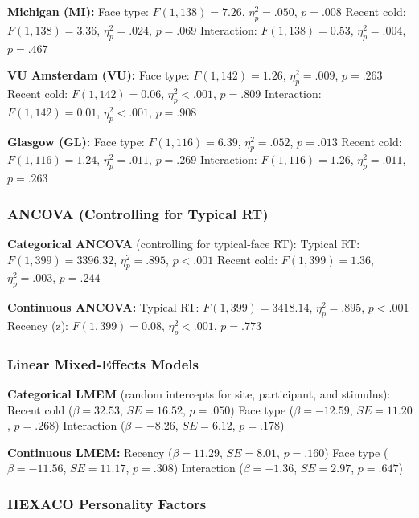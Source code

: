 \documentclass[
  english,
  man]{apa6}
\begin{document}
\textbf{Michigan (MI):}
Face type: \(F(1, 138) = 7.26\), \(\eta_{p}^{2} = .050\), \(p = .008\)
Recent cold: \(F(1, 138) = 3.36\), \(\eta_{p}^{2} = .024\), \(p = .069\)
Interaction: \(F(1, 138) = 0.53\), \(\eta_{p}^{2} = .004\), \(p = .467\)

\textbf{VU Amsterdam (VU):}
Face type: \(F(1, 142) = 1.26\), \(\eta_{p}^{2} = .009\), \(p = .263\)
Recent cold: \(F(1, 142) = 0.06\), \(\eta_{p}^{2} < .001\), \(p = .809\)
Interaction: \(F(1, 142) = 0.01\), \(\eta_{p}^{2} < .001\), \(p = .908\)

\textbf{Glasgow (GL):}
Face type: \(F(1, 116) = 6.39\), \(\eta_{p}^{2} = .052\), \(p = .013\)
Recent cold: \(F(1, 116) = 1.24\), \(\eta_{p}^{2} = .011\), \(p = .269\)
Interaction: \(F(1, 116) = 1.26\), \(\eta_{p}^{2} = .011\), \(p = .263\)

\subsubsection{ANCOVA (Controlling for Typical RT)}\label{ancova-controlling-for-typical-rt}

\textbf{Categorical ANCOVA} (controlling for typical-face RT):
Typical RT: \(F(1, 399) = 3396.32\), \(\eta_{p}^{2} = .895\), \(p < .001\)
Recent cold: \(F(1, 399) = 1.36\), \(\eta_{p}^{2} = .003\), \(p = .244\)

\textbf{Continuous ANCOVA:}
Typical RT: \(F(1, 399) = 3418.14\), \(\eta_{p}^{2} = .895\), \(p < .001\)
Recency (z): \(F(1, 399) = 0.08\), \(\eta_{p}^{2} < .001\), \(p = .773\)

\subsubsection{Linear Mixed-Effects Models}\label{linear-mixed-effects-models}

\textbf{Categorical LMEM} (random intercepts for site, participant, and stimulus):
Recent cold (\(\beta = 32.53\), \(SE = 16.52\), \(p = .050\))
Face type (\(\beta = -12.59\), \(SE = 11.20\), \(p = .268\))
Interaction (\(\beta = -8.26\), \(SE = 6.12\), \(p = .178\))

\textbf{Continuous LMEM:}
Recency (\(\beta = 11.29\), \(SE = 8.01\), \(p = .160\))
Face type (\(\beta = -11.56\), \(SE = 11.17\), \(p = .308\))
Interaction (\(\beta = -1.36\), \(SE = 2.97\), \(p = .647\))

\subsubsection{HEXACO Personality Factors}\label{hexaco-personality-factors}
\end{document}
